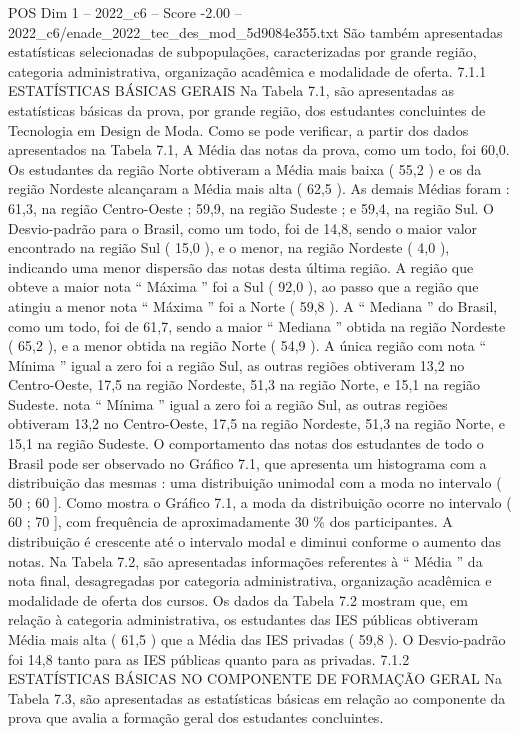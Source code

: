 \begin{textsample}{POS Dim 1 – 2022\_c6 – Score -2.00 – 2022\_c6/enade\_2022\_tec\_des\_mod\_5d9084e355.txt}
São também apresentadas estatísticas selecionadas de subpopulações, caracterizadas por grande região, categoria administrativa, organização acadêmica e modalidade de oferta. 7.1.1 ESTATÍSTICAS BÁSICAS GERAIS Na Tabela 7.1, são apresentadas as estatísticas básicas da prova, por grande região, dos estudantes concluintes de Tecnologia em Design de Moda.
Como se pode verificar, a partir dos dados apresentados na Tabela 7.1, A Média das notas da prova, como um todo, foi 60,0.
Os estudantes da região Norte obtiveram a Média mais baixa ( 55,2 ) e os da região Nordeste alcançaram a Média mais alta ( 62,5 ).
As demais Médias foram : 61,3, na região Centro-Oeste ; 59,9, na região Sudeste ; e 59,4, na região Sul.
O Desvio-padrão para o Brasil, como um todo, foi de 14,8, sendo o maior valor encontrado na região Sul ( 15,0 ), e o menor, na região Nordeste ( 4,0 ), indicando uma menor dispersão das notas desta última região.
A região que obteve a maior nota “ Máxima ” foi a Sul ( 92,0 ), ao passo que a região que atingiu a menor nota “ Máxima ” foi a Norte ( 59,8 ).
A “ Mediana ” do Brasil, como um todo, foi de 61,7, sendo a maior “ Mediana ” obtida na região Nordeste ( 65,2 ), e a menor obtida na região Norte ( 54,9 ).
A única região com nota “ Mínima ” igual a zero foi a região Sul, as outras regiões obtiveram 13,2 no Centro-Oeste, 17,5 na região Nordeste, 51,3 na região Norte, e 15,1 na região Sudeste. nota “ Mínima ” igual a zero foi a região Sul, as outras regiões obtiveram 13,2 no Centro-Oeste, 17,5 na região Nordeste, 51,3 na região Norte, e 15,1 na região Sudeste.
O comportamento das notas dos estudantes de todo o Brasil pode ser observado no Gráfico 7.1, que apresenta um histograma com a distribuição das mesmas : uma distribuição unimodal com a moda no intervalo ( 50 ; 60 ].
Como mostra o Gráfico 7.1, a moda da distribuição ocorre no intervalo ( 60 ; 70 ], com frequência de aproximadamente 30 \% dos participantes.
A distribuição é crescente até o intervalo modal e diminui conforme o aumento das notas.
Na Tabela 7.2, são apresentadas informações referentes à “ Média ” da nota final, desagregadas por categoria administrativa, organização acadêmica e modalidade de oferta dos cursos.
Os dados da Tabela 7.2 mostram que, em relação à categoria administrativa, os estudantes das IES públicas obtiveram Média mais alta ( 61,5 ) que a Média das IES privadas ( 59,8 ).
O Desvio-padrão foi 14,8 tanto para as IES públicas quanto para as privadas. 7.1.2 ESTATÍSTICAS BÁSICAS NO COMPONENTE DE FORMAÇÃO GERAL Na Tabela 7.3, são apresentadas as estatísticas básicas em relação ao componente da prova que avalia a formação geral dos estudantes concluintes.

\end{textsample}
